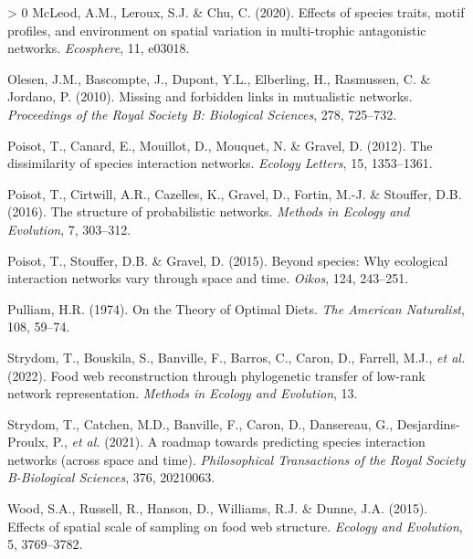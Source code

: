 \documentclass[10pt,oneside]{article}
\newlength{\cslhangindent}
\newenvironment{CSLReferences}[3] %
 {%
  \setlength{\parindent}{0pt}
  \ifodd #1 \everypar{\setlength{\hangindent}{\cslhangindent}}\ignorespaces\fi
  \ifnum #2 > 0
  \setlength{\parskip}{#2\baselineskip}
  \fi
 }%
 {}
\begin{document}
\begin{CSLReferences}{1}{0}
\leavevmode\hypertarget{ref-McLeod2020EffSpe}{}%
McLeod, A.M., Leroux, S.J. \& Chu, C. (2020). Effects of species traits,
motif profiles, and environment on spatial variation in multi-trophic
antagonistic networks. \emph{Ecosphere}, 11, e03018.

\leavevmode\hypertarget{ref-Olesen2010Missing}{}%
Olesen, J.M., Bascompte, J., Dupont, Y.L., Elberling, H., Rasmussen, C.
\& Jordano, P. (2010). Missing and forbidden links in mutualistic
networks. \emph{Proceedings of the Royal Society B: Biological
Sciences}, 278, 725--732.

\leavevmode\hypertarget{ref-Poisot2012Dissimilaritya}{}%
Poisot, T., Canard, E., Mouillot, D., Mouquet, N. \& Gravel, D. (2012).
The dissimilarity of species interaction networks. \emph{Ecology
Letters}, 15, 1353--1361.

\leavevmode\hypertarget{ref-Poisot2016Structure}{}%
Poisot, T., Cirtwill, A.R., Cazelles, K., Gravel, D., Fortin, M.-J. \&
Stouffer, D.B. (2016). The structure of probabilistic networks.
\emph{Methods in Ecology and Evolution}, 7, 303--312.

\leavevmode\hypertarget{ref-Poisot2015Speciesa}{}%
Poisot, T., Stouffer, D.B. \& Gravel, D. (2015). Beyond species: Why
ecological interaction networks vary through space and time.
\emph{Oikos}, 124, 243--251.

\leavevmode\hypertarget{ref-Pulliam1974Theory}{}%
Pulliam, H.R. (1974). On the Theory of Optimal Diets. \emph{The American
Naturalist}, 108, 59--74.

\leavevmode\hypertarget{ref-Strydom2022Food}{}%
Strydom, T., Bouskila, S., Banville, F., Barros, C., Caron, D., Farrell,
M.J., \emph{et al.} (2022). Food web reconstruction through phylogenetic
transfer of low-rank network representation. \emph{Methods in Ecology
and Evolution}, 13.

\leavevmode\hypertarget{ref-Strydom2021Roadmapa}{}%
Strydom, T., Catchen, M.D., Banville, F., Caron, D., Dansereau, G.,
Desjardins-Proulx, P., \emph{et al.} (2021). A roadmap towards
predicting species interaction networks (across space and time).
\emph{Philosophical Transactions of the Royal Society B-Biological
Sciences}, 376, 20210063.

\leavevmode\hypertarget{ref-Wood2015Effects}{}%
Wood, S.A., Russell, R., Hanson, D., Williams, R.J. \& Dunne, J.A.
(2015). Effects of spatial scale of sampling on food web structure.
\emph{Ecology and Evolution}, 5, 3769--3782.

\end{CSLReferences}
\end{document}
